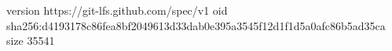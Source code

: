 version https://git-lfs.github.com/spec/v1
oid sha256:d4193178c86fea8bf2049613d33dab0e395a3545f12d1f1d5a0afc86b5ad35ca
size 35541
